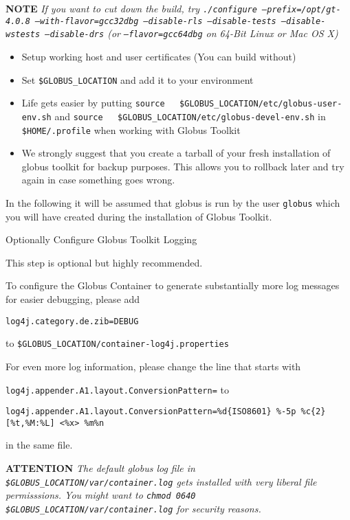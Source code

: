\documentclass{article}
\begin{document}
\textbf{NOTE}
\emph{If you want to cut down the build, try \texttt{./configure   --prefix=/opt/gt-4.0.8 --with-flavor=gcc32dbg --disable-rls   --disable-tests --disable-wstests --disable-drs} (or \texttt{--flavor=gcc64dbg} on 64-Bit Linux or Mac OS X)}

\begin{itemize}
\item
  Setup working host and user certificates (You can build without)
\item
  Set \verb!$GLOBUS_LOCATION! and add it to your environment
\item
  Life gets easier by putting
  \verb!source   $GLOBUS_LOCATION/etc/globus-user-env.sh! and
  \verb!source   $GLOBUS_LOCATION/etc/globus-devel-env.sh! in
  \verb!$HOME/.profile! when working with Globus Toolkit
\item
  We strongly suggest that you create a tarball of your fresh
  installation of globus toolkit for backup purposes. This allows you
  to rollback later and try again in case something goes wrong.
\end{itemize}
In the following it will be assumed that globus is run by the user
\verb!globus! which you will have created during the installation
of Globus Toolkit.

Optionally Configure Globus Toolkit Logging

This step is optional but highly recommended.

To configure the Globus Container to generate substantially more
log messages for easier debugging, please add

\begin{verbatim}
log4j.category.de.zib=DEBUG
\end{verbatim}
to \verb!$GLOBUS_LOCATION/container-log4j.properties!

For even more log information, please change the line that starts
with 

\verb!log4j.appender.A1.layout.ConversionPattern=! to

\begin{verbatim}
log4j.appender.A1.layout.ConversionPattern=%d{ISO8601} %-5p %c{2} [%t,%M:%L] <%x> %m%n
\end{verbatim}
in the same file.

\textbf{ATTENTION}
\emph{The default globus log file in \texttt{\$GLOBUS\_LOCATION/var/container.log} gets installed with very liberal file permisssions. You might want to \texttt{chmod 0640 \$GLOBUS\_LOCATION/var/container.log} for security reasons.}
\end{document}
